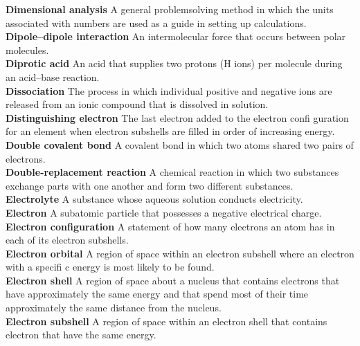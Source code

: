\documentclass[10pt, roman]{article}
\begin{document}
\noindent \begin{minipage}[c]{0.30\textwidth}
\textbf{Dimensional analysis} A general problemsolving method in which the units associated with numbers are used as a guide in setting up calculations. \\
\textbf{Dipole–dipole interaction} An intermolecular force that occurs between polar molecules. \\
\textbf{Diprotic acid} An acid that supplies two protons (H ions) per molecule during an acid–base reaction. \\
\textbf{Dissociation} The process in which individual positive and negative ions are released from an ionic compound that is dissolved in solution. \\
\textbf{Distinguishing electron} The last electron added to the electron confi guration for an element when electron subshells are filled in order of increasing energy. \\
\textbf{Double covalent bond} A covalent bond in which two atoms shared two pairs of electrons. \\
\textbf{Double-replacement reaction} A chemical reaction in which two substances exchange parts with one another and form two different substances. \\
\textbf{Electrolyte} A substance whose aqueous solution conducts electricity. \\
\textbf{Electron} A subatomic particle that possesses a negative electrical charge. \\
\textbf{Electron configuration} A statement of how many electrons an atom has in each of its electron subshells. \\
\textbf{Electron orbital} A region of space within an electron subshell where an electron with a specifi c energy is most likely to be found. \\
\textbf{Electron shell} A region of space about a nucleus that contains electrons that have approximately the same energy and that spend most of their time approximately the same distance from the nucleus. \\
\textbf{Electron subshell} A region of space within an electron shell that contains electron that have the same energy. \\
\end{minipage}%
\hfill
\end{document}
